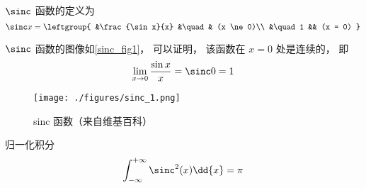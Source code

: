 

$\sinc$ 函数的定义为
\begin{equation}
\sinc x = 
\leftgroup{
&\frac{\sin x}{x} &\quad & (x \ne 0)\\
&\quad 1 && (x = 0)
}\end{equation}

$\sinc$ 函数的图像如\autoref{sinc_fig1}， 可以证明， 该函数在 $x=0$ 处是连续的， 即
\begin{equation}
\lim_{x \to 0}\frac{\sin x}{x} = \sinc 0 = 1
\end{equation}

\begin{figure}[ht]
\centering
\texttt{[image: ./figures/sinc\_1.png]}
\caption{sinc 函数（来自维基百科）} \label{sinc_fig1}
\end{figure}

归一化积分
\begin{equation}
\int_{-\infty}^{+\infty} \sinc^2(x) \dd{x} = \pi
\end{equation}

